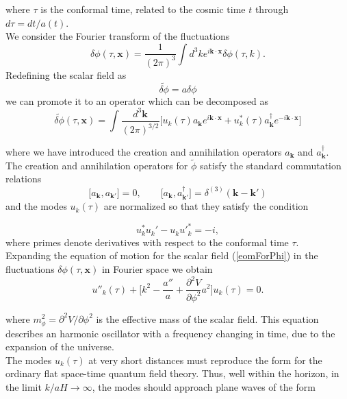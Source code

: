 \documentclass[11pt,a4paper,twoside]{book}
\begin{document}
where $ \tau $ is the conformal time, related to the cosmic time $ t $ through $ d\tau=dt/a(t) $.\\
We consider the Fourier transform of the fluctuations
\begin{equation}
\label{fourierTransform}
\delta\phi(\tau,\textbf{x})=\frac{1}{(2\pi)^{3}}\int d^{3}k e^{i \textbf{k}\cdot\textbf{x}}\delta\phi(\tau,k).
\end{equation}
Redefining  the scalar field as 
\begin{equation}
\label{fieldRedefinition}
\widetilde{\delta \phi}	= a\delta\phi
\end{equation}
 we can promote it to an operator which can be decomposed as 
 \begin{equation}
 	\label{quantitation}
 	\widetilde{\delta \phi}(\tau,\textbf{x})=\int \frac{d^{3} \textbf{k}}{(2\pi)^{3/2}} \big[u_{k}(\tau)a_{\textbf{k}}e^{i \textbf{k}\cdot\textbf{x}} + u_{k}^{*}(\tau)a_{\textbf{k}}^{\dagger}e^{-i \textbf{k}\cdot\textbf{x}}\big]
 \end{equation}
 
 where we have introduced the creation and annihilation operators $ a_{\textbf{k}} $ and $ a^{\dagger}_{\textbf{k}} $.\\
 The creation and annihilation operators for $\widetilde{\phi}$ satisfy the standard commutation relations
 \begin{equation}
 	\label{commutationRelations}
 \big[a_{\textbf{k}},a_{\textbf{k}'}] = 0, \qquad \big[a_{\textbf{k}},a_{\textbf{k}'}^{\dagger}] = \delta^{(3)}(\textbf{k}-\textbf{k}')
 \end{equation}
and the modes $ u_{k}(\tau) $ are normalized so that they satisfy the condition

\begin{equation}
	\label{normalitation}
	u^{\ast}_{k} u_{k}' - u_{k} u'^{\ast}_{k} = -i,
\end{equation}
where primes denote derivatives with respect to the conformal time $ \tau $. \\
Expanding the equation of motion for the scalar field (\ref{eomForPhi}) in the fluctuations $\delta\phi(\tau,\textbf{x})$ in Fourier space we obtain
\begin{equation}
	\label{eomFluctuations}
	u''_{k}(\tau) + \Big[k^{2} - \frac{a''}{a} + \frac{\partial^{2} V}{\partial\phi^{2}}a^{2}\Big] u_{k}(\tau) = 0.
\end{equation}

 where $ m^{2}_{\phi} = \partial^{2} V / \partial\phi^{2} $ is the effective mass of the scalar field. This equation describes an harmonic oscillator with a frequency changing in time, due to the expansion of the universe.\\
 The modes $ u_{k}(\tau) $ at very short distances must reproduce the form for the ordinary flat space-time quantum field theory. Thus, well within the horizon, in the limit $ k/aH \rightarrow \infty $, the modes should approach plane waves of the form
 
\end{document}
